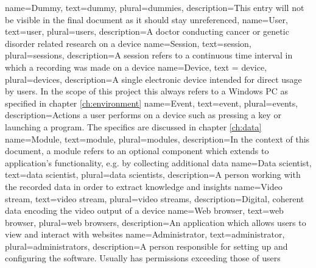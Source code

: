 \label{ch:glossary}

{
	name=Dummy, %
	text=dummy, %
	plural=dummies, %
	description={This entry will not be visible in the final document as it should stay unreferenced}, %
}
{
	name=User,
	text=user,
	plural=users,
	description={A doctor conducting cancer or genetic disorder related research on a \gls{device}}
}
{
	name=Session,
	text=session,
	plural=sessions,
	description={A session refers to a continuous time interval in which a recording was made on a \gls{device}}
}
{
	name=Device,
	text = device,
	plural=devices,
	description={A single electronic device intended for direct usage by \glspl{user}. In the scope of this project this always refers to a Windows PC as specified in chapter \ref{ch:environment}}
}
{
	name=Event,
	text=event,
	plural=events,
	description={Actions a user performs on a \gls{device} such as pressing a key or launching a program. The specifics are discussed in chapter \ref{ch:data}}
}
{
	name=Module,
	text=module,
	plural=modules,
	description={In the context of this document, a module refers to an optional component which extends to application's functionality, e.g. by collecting additional data}
}
{
	name=Data scientist,
	text=data scientist,
	plural=data scientists,
	description={A person working with the recorded data in order to extract knowledge and insights}
}
{
	name=Video stream,
	text=video stream,
	plural=video streams,
	description={Digital, coherent data encoding the video output of a \gls{device}}
}
   {
   	name=Web browser,
   	text=web browser,
   	plural=web browsers,
	description={An application which allows \glspl{user} to view and interact with websites}
}
{
	name=Administrator,
	text=administrator,
	plural=administrators,
	description={A person responsible for setting up and configuring the software. Usually has permissions exceeding those of \glspl{user}}
}